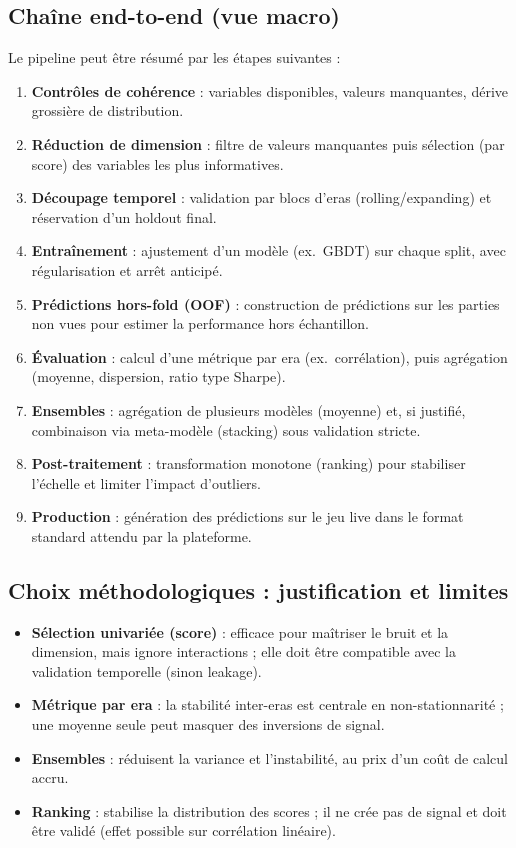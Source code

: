 \documentclass[11pt,a4paper]{article}
\newcommand{\1}{\mathbf{1}}
\begin{document}
\subsection*{Cha\^{i}ne end-to-end (vue macro)}
Le pipeline peut \^etre r\'esum\'e par les \'etapes suivantes :
\begin{enumerate}[leftmargin=*, itemsep=3pt]
  \item \textbf{Contr\^oles de coh\'erence} : variables disponibles, valeurs manquantes, d\'erive grossi\`ere de distribution.
  \item \textbf{R\'eduction de dimension} : filtre de valeurs manquantes puis s\'election (par score) des variables les plus informatives.
  \item \textbf{D\'ecoupage temporel} : validation par blocs d'eras (rolling/expanding) et r\'eservation d'un holdout final.
  \item \textbf{Entra\^{i}nement} : ajustement d'un mod\`ele (ex.\ GBDT) sur chaque split, avec r\'egularisation et arr\^et anticip\'e.
  \item \textbf{Pr\'edictions hors-fold (OOF)} : construction de pr\'edictions sur les parties non vues pour estimer la performance hors \'echantillon.
  \item \textbf{\'Evaluation} : calcul d'une m\'etrique par era (ex.\ corr\'elation), puis agr\'egation (moyenne, dispersion, ratio type Sharpe).
  \item \textbf{Ensembles} : agr\'egation de plusieurs mod\`eles (moyenne) et, si justifi\'e, combinaison via meta-mod\`ele (stacking) sous validation stricte.
  \item \textbf{Post-traitement} : transformation monotone (ranking) pour stabiliser l'\'echelle et limiter l'impact d'outliers.
  \item \textbf{Production} : g\'en\'eration des pr\'edictions sur le jeu live dans le format standard attendu par la plateforme.
\end{enumerate}

\subsection*{Choix m\'ethodologiques : justification et limites}
\begin{itemize}
  \item \textbf{S\'election univari\'ee (score)} : efficace pour ma\^{i}triser le bruit et la dimension, mais ignore interactions ; elle doit \^etre compatible avec la validation temporelle (sinon leakage).
  \item \textbf{M\'etrique par era} : la stabilit\'e inter-eras est centrale en non-stationnarit\'e ; une moyenne seule peut masquer des inversions de signal.
  \item \textbf{Ensembles} : r\'eduisent la variance et l'instabilit\'e, au prix d'un co\^ut de calcul accru.
  \item \textbf{Ranking} : stabilise la distribution des scores ; il ne cr\'ee pas de signal et doit \^etre valid\'e (effet possible sur corr\'elation lin\'eaire).
\end{itemize}
\end{document}

